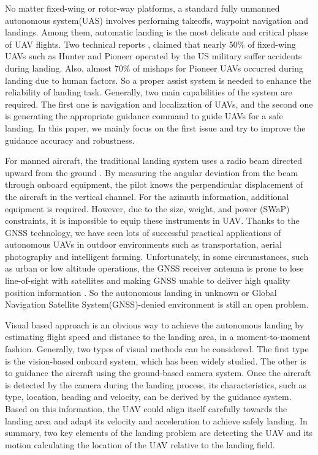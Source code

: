 No matter fixed-wing or rotor-way platforms, a standard fully unmanned autonomous system(UAS) involves performing takeoffs, waypoint navigation and landings. Among them, automatic landing is the most delicate and critical phase of UAV flights. Two technical reports \cite{williams2004summary,manning2004role}, claimed that nearly 50\% of fixed-wing UAVs such as Hunter and Pioneer operated by the US military suffer accidents during landing. Also, almost 70\% of mishaps for Pioneer UAVs occurred during landing due to human factors. So a proper assist system is needed to enhance the reliability of landing task. Generally, two main capabilities of the system are required. The first one is navigation and localization of UAVs, and the second one is generating the appropriate guidance command to guide UAVs for a safe landing. In this paper, we mainly focus on the first issue and try to improve the guidance accuracy and robustness.


For manned aircraft, the traditional landing system uses a radio beam directed upward from the ground \cite{mclean1990automatic, stevens2003aircraft}. By measuring the angular deviation from the beam through onboard equipment, the pilot knows the perpendicular displacement of the aircraft in the vertical channel. For the azimuth information, additional equipment is required. However, due to the size, weight, and power (SWaP) constraints, it is impossible to equip these instruments in UAV. Thanks to the GNSS technology, we have seen lots of successful practical applications of autonomous UAVs in outdoor environments such as transportation, aerial photography and intelligent farming. Unfortunately, in some circumstances, such as urban or low altitude operations, the GNSS receiver antenna is prone to lose line-of-sight with satellites and making GNSS unable to deliver high quality position information \cite{farrell1998gps}. So the autonomous landing in unknown or Global Navigation Satellite System(GNSS)-denied environment is still an open problem. 

Visual based approach is an obvious way to achieve the autonomous landing by estimating flight speed and distance to the landing area, in a moment-to-moment fashion. Generally, two types of visual methods can be considered. The first type is the vision-based onboard system, which has been widely studied. The other is to guidance the aircraft using the ground-based camera system. Once the aircraft is detected by the camera during the landing process, its characteristics, such as type, location, heading and velocity, can be derived by the guidance system. Based on this information, the UAV could align itself carefully towards the landing area and adapt its velocity and acceleration to achieve safely landing. In summary, two key elements of the landing problem are detecting the UAV and its motion calculating the location of the UAV relative to the landing field. 

